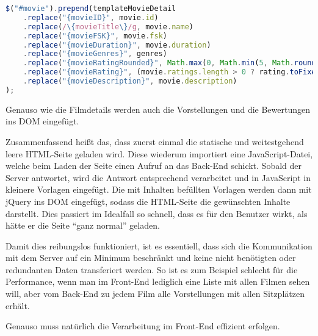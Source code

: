 \begin{lstlisting}[language=JavaScript]
$("#movie").prepend(templateMovieDetail
	.replace("{movieID}", movie.id)
	.replace(/\{movieTitle\}/g, movie.name)
	.replace("{movieFSK}", movie.fsk)
	.replace("{movieDuration}", movie.duration)
	.replace("{movieGenres}", genres)
	.replace("{movieRatingRounded}", Math.max(0, Math.min(5, Math.round(rating))))
	.replace("{movieRating}", (movie.ratings.length > 0 ? rating.toFixed(1).replace(".",",") : "") + " (" + movie.ratings.length + " Bewertung" + (movie.ratings.length == 1 ? "" : "en") + ")")
	.replace("{movieDescription}", movie.description)
);
\end{lstlisting}
\label{lst:js_write_movie_detail_to_dom}

Genauso wie die Filmdetails werden auch die Vorstellungen und die Bewertungen ins \acs{DOM} eingefügt.

Zusammenfassend heißt das, dass zuerst einmal die statische und weitestgehend leere \acs{HTML}-Seite geladen wird.
Diese wiederum importiert eine JavaScript-Datei, welche beim Laden der Seite einen Aufruf an das Back-End schickt.
Sobald der Server antwortet, wird die Antwort entsprechend verarbeitet und in JavaScript in kleinere Vorlagen eingefügt.
Die mit Inhalten befüllten Vorlagen werden dann mit jQuery ins \acs{DOM} eingefügt, sodass die \acs{HTML}-Seite die gewünschten Inhalte darstellt.
Dies passiert im Idealfall so schnell, dass es für den Benutzer wirkt, als hätte er die Seite \enquote{ganz normal} geladen.

Damit dies reibungslos funktioniert, ist es essentiell, dass sich die Kommunikation mit dem Server auf ein Minimum beschränkt und keine nicht benötigten oder redundanten Daten transferiert werden.
So ist es zum Beispiel schlecht für die Performance, wenn man im Front-End lediglich eine Liste mit allen Filmen sehen will, aber vom Back-End zu jedem Film alle Vorstellungen mit allen Sitzplätzen erhält.

Genauso muss natürlich die Verarbeitung im Front-End effizient erfolgen.